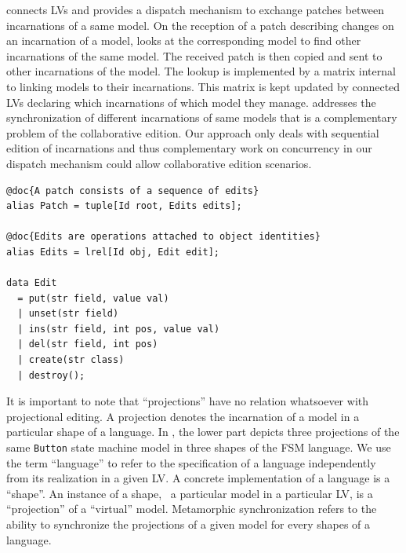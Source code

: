 \prism connects LVs and provides a dispatch mechanism to exchange patches between incarnations of a same model.
On the reception of a patch describing changes on an incarnation of a model, \prism looks at the corresponding model to find other incarnations of the same model.
The received patch is then copied and sent to other incarnations of the model.
The lookup is implemented by a matrix internal to \prism linking models to their incarnations. This matrix is kept updated by connected LVs declaring which incarnations of which model they manage.
\prism addresses the synchronization of different incarnations of same models that is a complementary problem of the collaborative edition.
Our approach only deals with sequential edition of incarnations and thus complementary work on concurrency in our dispatch mechanism could allow collaborative edition scenarios.


\begin{lstlisting}[label=lst:delta-adt, caption={CRUD-like patch definition in Rascal.}, language=Rascal, float=tb]
@doc{A patch consists of a sequence of edits}
alias Patch = tuple[Id root, Edits edits];

@doc{Edits are operations attached to object identities}
alias Edits = lrel[Id obj, Edit edit];

data Edit
  = put(str field, value val)
  | unset(str field)
  | ins(str field, int pos, value val)
  | del(str field, int pos)
  | create(str class) 
  | destroy();
\end{lstlisting}

It is important to note that ``projections'' have no relation whatsoever with projectional editing.
A projection denotes the incarnation of a model in a particular shape of a language.
In , the lower part depicts three projections of the same \texttt{Button} state machine model in three shapes of the FSM language.
We use the term ``language'' to refer to the specification of a language independently from its realization in a given LV.
A concrete implementation of a language is a ``shape''.
An instance of a shape, \ie~a particular model in a particular LV, is a ``projection'' of a ``virtual'' model.
Metamorphic synchronization refers to the ability to synchronize the projections of a given model for every shapes of a language.
